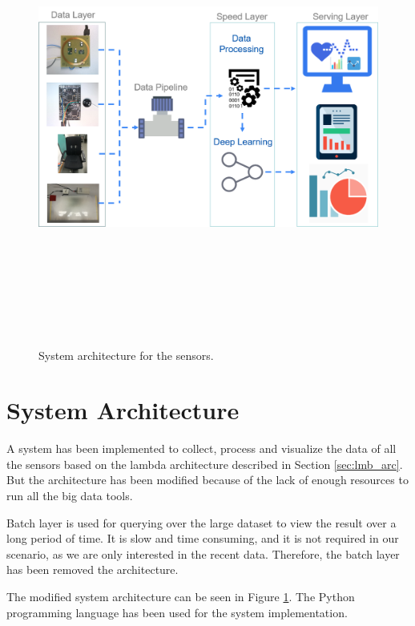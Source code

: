 \begin{figure}[h]
	\centering
	\includegraphics[width=16cm,height=15cm,keepaspectratio=true]{images/sys_arc}
	\caption{
		System architecture for the sensors.
	}
	\label{fig:sys_arc}
\end{figure}

\section{System Architecture}
A system has been implemented to collect, process and visualize the data of all the sensors based on the lambda architecture described in Section \ref{sec:lmb_arc}. But the architecture has been modified because of the lack of enough resources to run all the big data tools.

Batch layer is used for querying over the large dataset to view the result over a long period of time. It is slow and time consuming, and it is not required in our scenario, as we are only interested in the recent data. Therefore, the batch layer has been removed the architecture.

 The modified system architecture can be seen in Figure \ref{fig:sys_arc}. The Python programming language has been used for the system implementation.


